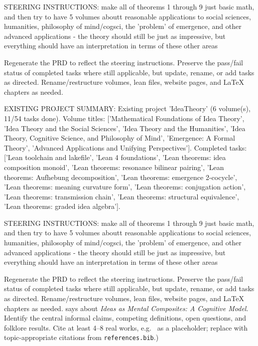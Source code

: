 STEERING INSTRUCTIONS: make all of theorems 1 through 9 just basic math, and then try to have 5 volumes aboutt reasonable applications to social sciences, humanities, philosophy of mind/cogsci, the 'problem' of emergence, and other advanced applications - the theory should still be just as impressive, but everything should have an interpretation in terms of these other areas

Regenerate the PRD to reflect the steering instructions. Preserve the pass/fail status of completed tasks where still applicable, but update, rename, or add tasks as directed. Rename/restructure volumes, lean files, website pages, and LaTeX chapters as needed.

EXISTING PROJECT SUMMARY: Existing project 'IdeaTheory' (6 volume(s), 11/54 tasks done). Volume titles: ['Mathematical Foundations of Idea Theory', 'Idea Theory and the Social Sciences', 'Idea Theory and the Humanities', 'Idea Theory, Cognitive Science, and Philosophy of Mind', 'Emergence: A Formal Theory', 'Advanced Applications and Unifying Perspectives']. Completed tasks: ['Lean toolchain and lakefile', 'Lean 4 foundations', 'Lean theorems: idea composition monoid', 'Lean theorems: resonance bilinear pairing', 'Lean theorems: Aufhebung decomposition', 'Lean theorems: emergence 2-cocycle', 'Lean theorems: meaning curvature form', 'Lean theorems: conjugation action', 'Lean theorems: transmission chain', 'Lean theorems: structural equivalence', 'Lean theorems: graded idea algebra'].

STEERING INSTRUCTIONS: make all of theorems 1 through 9 just basic math, and then try to have 5 volumes aboutt reasonable applications to social sciences, humanities, philosophy of mind/cogsci, the 'problem' of emergence, and other advanced applications - the theory should still be just as impressive, but everything should have an interpretation in terms of these other areas

Regenerate the PRD to reflect the steering instructions. Preserve the pass/fail status of completed tasks where still applicable, but update, rename, or add tasks as directed. Rename/restructure volumes, lean files, website pages, and LaTeX chapters as needed. says about \emph{Ideas as Mental Composites: A Cognitive Model}.  Identify the
        central informal claims, competing definitions, open questions, and
        folklore results.  Cite at least 4--8 real works, e.g.\ \cite{
        lean4_tpil} as a placeholder; replace with topic-appropriate
        citations from \texttt{references.bib}.)

